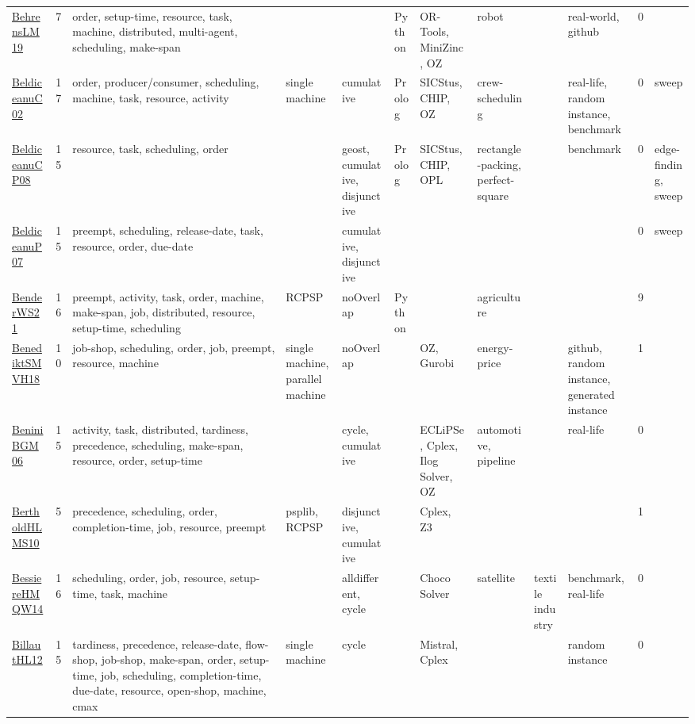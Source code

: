 {\begin{longtable}{p{3cm}rp{4cm}p{1.5cm}p{2cm}p{1.5cm}p{1.5cm}p{1.5cm}p{1.5cm}p{2cm}rp{1.5cm}}
\href{papers/BehrensLM19.pdf}{BehrensLM19}~\cite{BehrensLM19} & 7 & order, setup-time, resource, task, machine, distributed, multi-agent, scheduling, make-span &  &  & Python & OR-Tools, MiniZinc, OZ & robot &  & real-world, github & 0 & \\
\href{papers/BeldiceanuC02.pdf}{BeldiceanuC02}~\cite{BeldiceanuC02} & 17 & order, producer/consumer, scheduling, machine, task, resource, activity & single machine & cumulative & Prolog & SICStus, CHIP, OZ & crew-scheduling &  & real-life, random instance, benchmark & 0 & sweep\\
\href{papers/BeldiceanuCP08.pdf}{BeldiceanuCP08}~\cite{BeldiceanuCP08} & 15 & resource, task, scheduling, order &  & geost, cumulative, disjunctive & Prolog & SICStus, CHIP, OPL & rectangle-packing, perfect-square &  & benchmark & 0 & edge-finding, sweep\\
\href{papers/BeldiceanuP07.pdf}{BeldiceanuP07}~\cite{BeldiceanuP07} & 15 & preempt, scheduling, release-date, task, resource, order, due-date &  & cumulative, disjunctive &  &  &  &  &  & 0 & sweep\\
\href{papers/BenderWS21.pdf}{BenderWS21}~\cite{BenderWS21} & 16 & preempt, activity, task, order, machine, make-span, job, distributed, resource, setup-time, scheduling & RCPSP & noOverlap & Python &  & agriculture &  &  & 9 & \\
\href{papers/BenediktSMVH18.pdf}{BenediktSMVH18}~\cite{BenediktSMVH18} & 10 & job-shop, scheduling, order, job, preempt, resource, machine & single machine, parallel machine & noOverlap &  & OZ, Gurobi & energy-price &  & github, random instance, generated instance & 1 & \\
\href{papers/BeniniBGM06.pdf}{BeniniBGM06}~\cite{BeniniBGM06} & 15 & activity, task, distributed, tardiness, precedence, scheduling, make-span, resource, order, setup-time &  & cycle, cumulative &  & ECLiPSe, Cplex, Ilog Solver, OZ & automotive, pipeline &  & real-life & 0 & \\
\href{papers/BertholdHLMS10.pdf}{BertholdHLMS10}~\cite{BertholdHLMS10} & 5 & precedence, scheduling, order, completion-time, job, resource, preempt & psplib, RCPSP & disjunctive, cumulative &  & Cplex, Z3 &  &  &  & 1 & \\
\href{papers/BessiereHMQW14.pdf}{BessiereHMQW14}~\cite{BessiereHMQW14} & 16 & scheduling, order, job, resource, setup-time, task, machine &  & alldifferent, cycle &  & Choco Solver & satellite & textile industry & benchmark, real-life & 0 & \\
\href{papers/BillautHL12.pdf}{BillautHL12}~\cite{BillautHL12} & 15 & tardiness, precedence, release-date, flow-shop, job-shop, make-span, order, setup-time, job, scheduling, completion-time, due-date, resource, open-shop, machine, cmax & single machine & cycle &  & Mistral, Cplex &  &  & random instance & 0 & \\

\end{longtable}}
